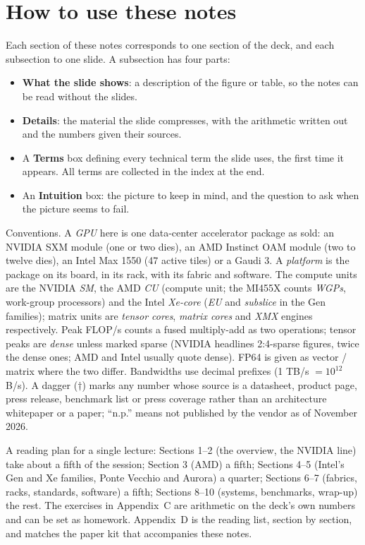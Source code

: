 \documentclass[11pt,letterpaper]{article}
\newcommand{\setstage}[1]{\colorlet{stagec}{#1}}
\begin{document}
\tableofcontents
\clearpage

\section*{How to use these notes}
Each section of these notes corresponds to one section of the deck, and each subsection to one slide. A subsection has four parts:
\begin{itemize}
  \item \textbf{What the slide shows}: a description of the figure or table, so the notes can be read without the slides.
  \item \textbf{Details}: the material the slide compresses, with the arithmetic written out and the numbers given their sources.
  \item A \textbf{Terms} box defining every technical term the slide uses, the first time it appears. All terms are collected in the index at the end.
  \item An \textbf{Intuition} box: the picture to keep in mind, and the question to ask when the picture seems to fail.
\end{itemize}
Conventions. A \emph{GPU} here is one data-center accelerator package as sold: an NVIDIA SXM module (one or two dies), an AMD Instinct OAM module (two to twelve dies), an Intel Max 1550 (47 active tiles) or a Gaudi 3. A \emph{platform} is the package on its board, in its rack, with its fabric and software. The compute units are the NVIDIA \emph{SM}, the AMD \emph{CU} (compute unit; the MI455X counts \emph{WGPs}, work-group processors) and the Intel \emph{Xe-core} (\emph{EU} and \emph{subslice} in the Gen families); matrix units are \emph{tensor cores}, \emph{matrix cores} and \emph{XMX} engines respectively. Peak FLOP/s counts a fused multiply-add as two operations; tensor peaks are \emph{dense} unless marked sparse (NVIDIA headlines 2:4-sparse figures, twice the dense ones; AMD and Intel usually quote dense). FP64 is given as vector / matrix where the two differ. Bandwidths use decimal prefixes (1 TB/s $=10^{12}$ B/s). A dagger ($\dagger$) marks any number whose source is a datasheet, product page, press release, benchmark list or press coverage rather than an architecture whitepaper or a paper; ``n.p.'' means not published by the vendor as of November 2026.

A reading plan for a single lecture: Sections 1--2 (the overview, the NVIDIA line) take about a fifth of the session; Section 3 (AMD) a fifth; Sections 4--5 (Intel's Gen and Xe families, Ponte Vecchio and Aurora) a quarter; Sections 6--7 (fabrics, racks, standards, software) a fifth; Sections 8--10 (systems, benchmarks, wrap-up) the rest. The exercises in Appendix~C are arithmetic on the deck's own numbers and can be set as homework. Appendix~D is the reading list, section by section, and matches the paper kit that accompanies these notes.
\setstage{ink}
\end{document}
